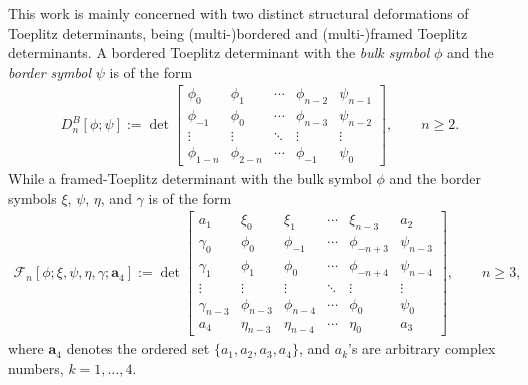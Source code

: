 \documentclass[pdftex]{sigma}
\numberwithin{equation}{section}
\newcommand{\ga}{\gamma}
\begin{document}
This work is mainly concerned with two distinct structural deformations of Toeplitz determinants, being (multi-)bordered and (multi-)framed Toeplitz determinants. A bordered Toeplitz determinant with the \textit{bulk symbol} $\phi$ and the \textit{border symbol} $\psi$ is of the form
\begin{gather}\label{btd0}
	D^{B}_{n}[\phi; \psi] := \det \begin{bmatrix}
		\phi_0& \phi_1 & \cdots & \phi_{n-2} & \psi_{n-1}\\
		\phi_{-1}& \phi_0 & \cdots & \phi_{n-3}&\psi_{n-2} \\
		\vdots & \vdots & \ddots & \vdots & \vdots\\
		\phi_{1-n} & \phi_{2-n} & \cdots & \phi_{-1}&\psi_{0}
	\end{bmatrix}, \qquad n \geq 2.
\end{gather}
While a framed-Toeplitz determinant with the bulk symbol $\phi$ and the border symbols $\xi$, $\psi$, $\eta$, and $\ga$ is of the form
\begin{gather}\label{framed intro}
	\mathscr{F}_{n}\left[\phi; \xi, \psi, \eta, \ga; \boldsymbol{a}_4\right] := \det \begin{bmatrix}
		a_1 & \xi_{0} & \xi_{1} & \cdots & \xi_{n-3} & a_2 \\
		\ga_{0} &	\phi_0& \phi_{-1} & \cdots & \phi_{-n+3} & \psi_{n-3} \\
		\ga_{1} &	\phi_{1}& \phi_0 & \cdots & \phi_{-n+4} & \psi_{n-4} \\
		\vdots &	\vdots & \vdots & \ddots & \vdots & \vdots \\
		\ga_{n-3} &	\phi_{n-3} & \phi_{n-4} & \cdots & \phi_{0} & \psi_{0} \\
		a_4 &	\eta_{n-3} & \eta_{n-4} & \cdots & \eta_{0} & a_3
	\end{bmatrix}, \qquad n \geq 3,
\end{gather}
where $\boldsymbol{a}_4$ denotes the ordered set $\{a_1, a_2, a_3, a_4\}$, and $a_k$'s are arbitrary complex numbers, ${k=1,\dots,4}$.
\end{document}
